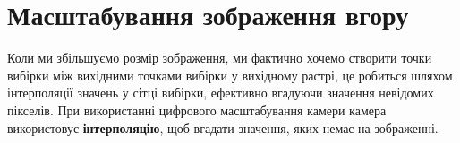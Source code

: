 \section{Масштабування зображення вгору}\label{sec:upscaling}
Коли ми збільшуємо розмір зображення, ми фактично хочемо створити точки вибірки між вихідними точками вибірки у вихідному растрі, це робиться шляхом інтерполяції значень у сітці вибірки, ефективно вгадуючи значення невідомих пікселів.
При використанні цифрового масштабування камери камера використовує \textbf{інтерполяцію}, щоб вгадати значення, яких немає на зображенні.

